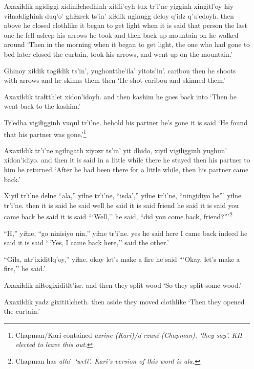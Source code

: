 \documentclass[12pt]{article}
\begin{document}
\gll Axaxiɬdik ngidiggi xidiniɬchedhinh xitili'eyh tux tr'i'ne yigginh {xingitl'oy hiy} viɬnaɬdighinh  duq'o' {ghiɬzrek ts'in'} xiɬdik nginugg deloy  q'idz q'u'edoyh.
then  above  {he closed clothlike} {it began to get light} when {it is said} {that person} {the last one} {he fell asleep} {his arrows} {he took} {and then} {back up} mountain on {he walked around}
\glt `Then in the morning when it began to get light, the one who had gone to bed later closed the curtain, took his arrows, and went up on the mountain.'
\glend

\gll Ghinoy xiɬdik  togiɬdik ts'in', yughontthe'ila' yitots'in'.
caribou  then  {he shoots with arrows} and {he skinns them} then
\glt `He shot caribou and skinned them.'
\glend

\gll Axaxiɬdik traɬtth'et xidon'idoyh.
{and then} kashim  {he goes back into}
\glt `Then he went back to the kashim.'
\glend

\gll Tr'edha vigiɬigginh vuqul  tr'i'ne.
behold {his partner} {he's gone} {it is said}
\glt `He found that his partner was gone.'\footnote{Chapman/Kari contained \em azrine \em (Kari)/\em aˊrzun\u{i} \em (Chapman), `they say'. KH elected to leave this out.}
\glend

\gll Axaxiɬdik tr'i'ne {ngiɬngath xiyozr} ts'in' yit dhido, xiyiɬ vigiɬigginh yughun' xidon'idiyo.
{and then} {it is said} {in a little while} {} there {he stayed} then {his partner} {to him} {he returned}
\glt `After he had been there for a little while, then his partner came back.'
\glend

\gll Xiyiɬ tr'i'ne deɬne  ``ala,''  yiɬne tr'i'ne, ``isda','' yiɬne tr'i'ne, {``ningidiyo he'''}  yiɬne  tr'i'ne.
then {it is said} {he said}  well  {he said} {it is said} friend  {he said} {it is said} {you came back}  {he said} {it is said}
\glt ```Well,'' he said, ``did you come back, friend?'''\footnote{Chapman has \em allaˊ \em `well'. Kari's version of this word is \em ala.}
\glend

\gll ``H,''  yiɬne, ``go ninisiyo nin,''  yiɬne  tr'i'ne.
yes  {he said}  here {I came back} indeed  {he said} {it is said}
\glt ```Yes, I came back here,'' said the other.'
\glend

\gll ``Gila, ntr'ixiditlq'oy,'' yiɬne.
okay  {let's make a fire} {he said}
\glt ```Okay, let's make a fire,'' he said.'
\glend

\gll Axaxiɬdik niɬtogixiditlt'isr.
{and then} {they split wood}
\glt `So they split some wood.'
\glend

\gll Axaxiɬdik yadz gixititlcheth.
then aside {they moved clothlike}
\glt `Then they opened the curtain.'
\glend
\end{document}
